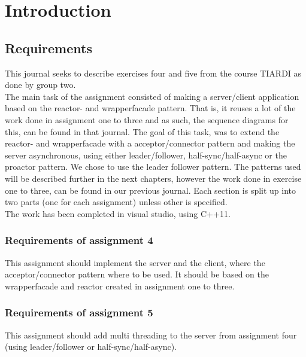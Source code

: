 \documentclass[Main]{subfiles}
\begin{document}
\chapter{Introduction}
\section{Requirements}
This journal seeks to describe exercises four and five from the course TIARDI as done by group two. \\
The main task of the assignment consisted of making a server/client application based on the reactor- and wrapperfacade pattern. That is, it reuses a lot of the work done in assignment one to three and as such, the sequence diagrams for this, can be found in  that journal. The goal of this task, was to extend the reactor- and wrapperfacade with a acceptor/connector pattern and making the server asynchronous, using either leader/follower, half-sync/half-async or the proactor pattern.
We chose to use the leader follower pattern.
The patterns used will be described further in the next chapters, however the work done in exercise one to three, can be found in our previous journal.
Each section is split up into two parts (one for each assignment) unless other is specified.\\
The work has been completed in visual studio, using C++11.

\subsection{Requirements of assignment 4}
This assignment should implement the server and the client, where the acceptor/connector pattern where to be used. It should be based on the wrapperfacade and reactor created in assignment one to three.

\subsection{Requirements of assignment 5}
This assignment should add multi threading to the server from assignment four (using leader/follower or half-sync/half-async).


\end{document}
